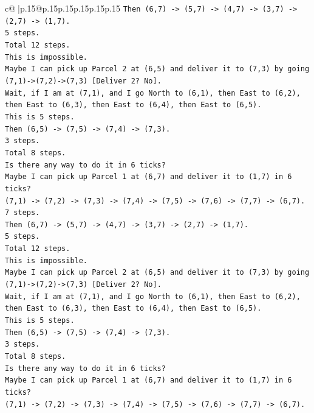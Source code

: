 \documentclass{article}
\begin{document}
{\begin{supertabular}{c@{$\;$}|p{.15\linewidth}@{}p{.15\linewidth}p{.15\linewidth}p{.15\linewidth}p{.15\linewidth}p{.15\linewidth}}
{{{\texttt{Then (6,7) {-}> (5,7) {-}> (4,7) {-}> (3,7) {-}> (2,7) {-}> (1,7).} \\
\texttt{5 steps.} \\
\texttt{Total 12 steps.} \\
\texttt{This is impossible.} \\
\texttt{Maybe I can pick up Parcel 2 at (6,5) and deliver it to (7,3) by going (7,1){-}>(7,2){-}>(7,3) {[}Deliver 2? No{]}.} \\
\texttt{Wait, if I am at (7,1), and I go North to (6,1), then East to (6,2), then East to (6,3), then East to (6,4), then East to (6,5).} \\
\texttt{This is 5 steps.} \\
\texttt{Then (6,5) {-}> (7,5) {-}> (7,4) {-}> (7,3).} \\
\texttt{3 steps.} \\
\texttt{Total 8 steps.} \\
\texttt{Is there any way to do it in 6 ticks?} \\
\texttt{Maybe I can pick up Parcel 1 at (6,7) and deliver it to (1,7) in 6 ticks?} \\
\texttt{(7,1) {-}> (7,2) {-}> (7,3) {-}> (7,4) {-}> (7,5) {-}> (7,6) {-}> (7,7) {-}> (6,7).} \\
\texttt{7 steps.} \\
\texttt{Then (6,7) {-}> (5,7) {-}> (4,7) {-}> (3,7) {-}> (2,7) {-}> (1,7).} \\
\texttt{5 steps.} \\
\texttt{Total 12 steps.} \\
\texttt{This is impossible.} \\
\texttt{Maybe I can pick up Parcel 2 at (6,5) and deliver it to (7,3) by going (7,1){-}>(7,2){-}>(7,3) {[}Deliver 2? No{]}.} \\
\texttt{Wait, if I am at (7,1), and I go North to (6,1), then East to (6,2), then East to (6,3), then East to (6,4), then East to (6,5).} \\
\texttt{This is 5 steps.} \\
\texttt{Then (6,5) {-}> (7,5) {-}> (7,4) {-}> (7,3).} \\
\texttt{3 steps.} \\
\texttt{Total 8 steps.} \\
\texttt{Is there any way to do it in 6 ticks?} \\
\texttt{Maybe I can pick up Parcel 1 at (6,7) and deliver it to (1,7) in 6 ticks?} \\
\texttt{(7,1) {-}> (7,2) {-}> (7,3) {-}> (7,4) {-}> (7,5) {-}> (7,6) {-}> (7,7) {-}> (6,7).} \\
}}}
\end{supertabular}}
\end{document}

